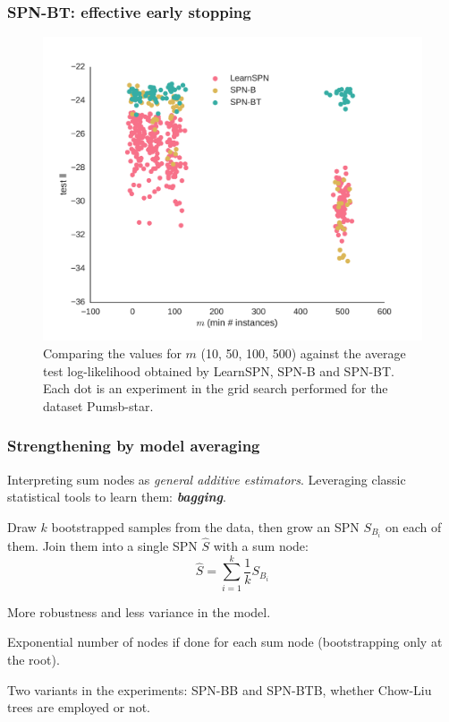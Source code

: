 \documentclass[xcolor={usenames,dvipsnames,svgnames}, compress]{beamer}
\begin{document}
\begin{frame}
  \frametitle{SPN-BT: effective early stopping}
  \begin{figure}[htbp]
    \begin{center}
      \includegraphics[width=0.7\linewidth]{figures/ll-m/10-8/pumsb-star-ll-m}
      \caption{Comparing the values for $m$ (10, 50, 100, 500) against
        the average test log-likelihood obtained by \textsf{LearnSPN},
        \textsf{SPN-B} and \textsf{SPN-BT}. Each dot is an experiment
        in the grid search performed for the dataset Pumsb-star.}
    \end{center}
  \end{figure}

\end{frame}

\begin{frame}
  \frametitle{Strengthening by model averaging}
  \footnotesize
  Interpreting sum nodes as \emph{general additive estimators}. Leveraging
  classic statistical tools to learn them:
  \textbf{\emph{bagging}}.\par\bigskip

  Draw $k$ bootstrapped samples from the data, then grow an SPN $S_{B_i}$ on
  each of them. Join them into a single SPN $\hat{S}$ with a sum node:
  $$\hat{S}=\sum_{i=1}^{k}\frac{1}{k}S_{B_{i}}$$

  More robustness and less variance in the model.\par\bigskip

  Exponential number of nodes if done for each sum node (bootstrapping
  only at the root).\par\bigskip

  Two variants in the experiments: \textsf{SPN-BB} and
  \textsf{SPN-BTB}, whether Chow-Liu trees are employed or not.
\end{frame}
\end{document}
